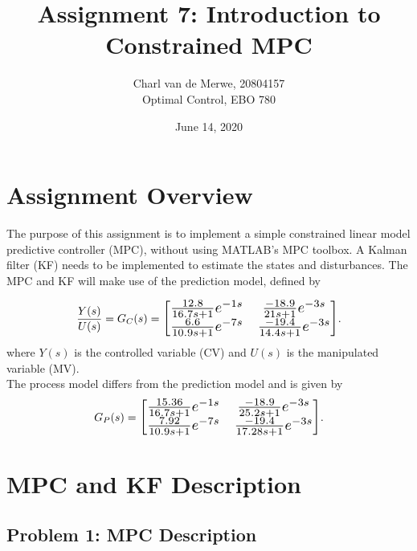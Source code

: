 \documentclass[12pt]{article}
\begin{document}
\title{Assignment 7: Introduction to Constrained MPC}
\author{Charl van de Merwe, 20804157\\
Optimal Control, EBO 780}
\date{June 14, 2020}

\maketitle

\section{Assignment Overview}
The purpose of this assignment is to implement a simple constrained linear model predictive controller (MPC), without using MATLAB's MPC toolbox. A Kalman filter (KF) needs to be implemented to estimate the states and disturbances. The MPC and KF will make use of the prediction model, defined by

\renewcommand\arraystretch{1.4}
\begin{equation}
\frac{Y(s)}{U(s)} = G_C(s) =
\scalebox{1.3}{$  
\begin{bmatrix}
\frac{12.8}{16.7s+1}e^{-1s} & \frac{-18.9}{21s+1}e^{-3s}\\
\frac{6.6}{10.9s+1}e^{-7s} & \frac{-19.4}{14.4s+1}e^{-3s}
\end{bmatrix}$}. \label{eq:predModel}
\end{equation}
\renewcommand\arraystretch{1}
where $Y(s)$ is the controlled variable (CV) and $U(s)$ is the manipulated variable (MV). \\

The process model differs from the prediction model and is given by
\renewcommand\arraystretch{1.4}
\begin{equation}
G_P(s) =
\scalebox{1.3}{$  
	\begin{bmatrix}
	\frac{15.36}{16.7s+1}e^{-1s} & \frac{-18.9}{25.2s+1}e^{-3s}\\
	\frac{7.92}{10.9s+1}e^{-7s} & \frac{-19.4}{17.28s+1}e^{-3s}
	\end{bmatrix}$}. \label{eq:procModel}
\end{equation}
\renewcommand\arraystretch{1}

\section{MPC and KF Description}
\label{sec:mpcDesc}

\subsection{Problem 1: MPC Description}
\label{sec:MPCDescription}
\end{document}
